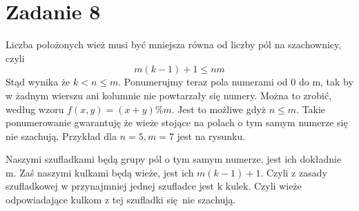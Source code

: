 \documentclass{article}
\begin{document}
\newpage
\section*{Zadanie 8}

Liczba położonych wież musi być mniejsza równa od liczby pól na szachownicy, czyli 
\[m(k-1) + 1 \leq n m\]
Stąd wynika że $k < n \leq m$. Ponumerujmy teraz pola numerami od 0 do m, tak by w żadnym wierszu ani kolumnie nie powtarzały się numery. Można to zrobić, według wzoru $f(x,y) = (x+y) \% m$. Jest to możliwe gdyż $n \leq m$. Takie ponumerowanie gwarantuję że wieże stojące na polach o tym samym numerze się nie szachują.
Przykład dla $n = 5, m = 7$ jest na rysunku.
\begin{center}
\end{center}
Naszymi szufladkami będą grupy pól o tym samym numerze, jest ich dokładnie m. Zaś naszymi kulkami będą wieże, jest ich $m(k-1) + 1$. Czyli z zasady szufladkowej w przynajmniej jednej szufladce jest k kulek. Czyli wieże odpowiadające kulkom z tej szufladki się nie szachują.
\end{document}
